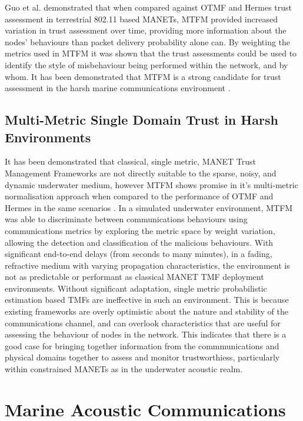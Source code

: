 \documentclass{aamas2016}
\begin{document}
Guo et al. demonstrated that when compared against OTMF and Hermes trust assessment in terrestrial 802.11 based MANETs, MTFM provided increased variation in trust assessment over time, providing more information about the nodes' behaviours than packet delivery probability alone can.
By weighting the metrics used in MTFM it was shown that the trust assessments could be used to identify the style of misbehaviour being performed within the network, and by whom.
It has been demonstrated that MTFM is a strong candidate for trust assessment in the harsh marine communications environment \cite{Bolster2015}.

\subsection{Multi-Metric Single Domain Trust in Harsh Environments}

It has been demonstrated that classical, single metric, MANET Trust Management Frameworks are not directly suitable to the sparse, noisy, and dynamic underwater medium, however MTFM shows promise in it's multi-metric normalisation approach when compared to the performance of OTMF and Hermes in the same scenarios \cite{Bolster2015}.
In a simulated underwater environment, MTFM was able to discriminate between communications behaviours using communications metrics by exploring the metric space by weight variation, allowing the detection and classification of the malicious behaviours.
With significant end-to-end delays (from seconds to many minutes), in a fading, refractive medium with varying propagation characteristics, the environment is not as predictable or performant as classical MANET TMF deployment environments. 
Without significant adaptation, single metric probabilistic estimation based TMFs are ineffective in such an environment. This is because existing frameworks are overly optimistic about the nature and stability of the communications channel, and can overlook characteristics that are useful for assessing the behaviour of nodes in the network. 
This indicates that there is a good case for bringing together information from the commmunications and physical domains together to assess and monitor trustworthiess, particularly within constrained MANETs as in the underwater acoustic realm.


\section{Marine Acoustic Communications}
\end{document}
